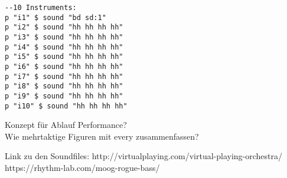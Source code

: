 \documentclass[
10pt, %
a4paper, %
oneside, %
headinclude,footinclude, %
BCOR5mm, %
]{scrartcl}
\begin{document}
\begin{lstlisting}
--10 Instruments:
p "i1" $ sound "bd sd:1"
p "i2" $ sound "hh hh hh hh"
p "i3" $ sound "hh hh hh hh"
p "i4" $ sound "hh hh hh hh"
p "i5" $ sound "hh hh hh hh"
p "i6" $ sound "hh hh hh hh"
p "i7" $ sound "hh hh hh hh"
p "i8" $ sound "hh hh hh hh"
p "i9" $ sound "hh hh hh hh"
p "i10" $ sound "hh hh hh hh"
\end{lstlisting}
Konzept für Ablauf Performance?\\
Wie mehrtaktige Figuren mit every zusammenfassen?

Link zu den Soundfiles: http://virtualplaying.com/virtual-playing-orchestra/ \\
https://rhythm-lab.com/moog-rogue-bass/

\pagebreak


\renewcommand{\refname}{\spacedlowsmallcaps{Literatur/Quellen}} %




\end{document}
